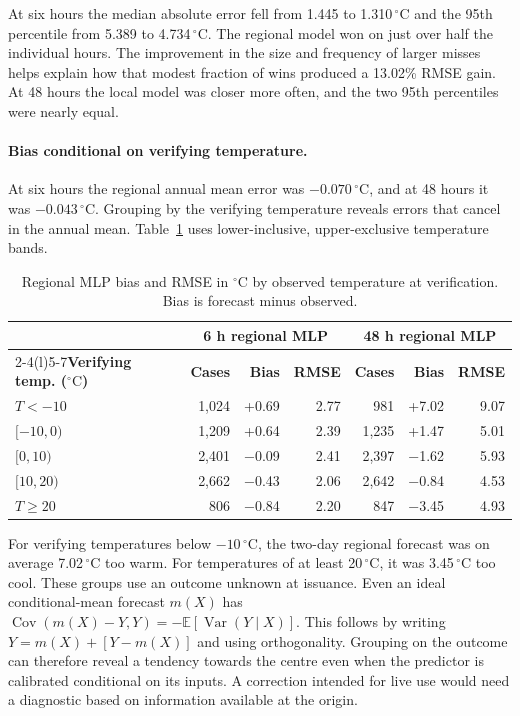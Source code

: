\documentclass[11pt,letterpaper]{article}
\newcommand{\thead}[1]{\textbf{#1}}\newcommand{\bestscore}[1]{\textbf{#1}}
\newcommand{\celsius}{\ensuremath{^{\circ}\mathrm{C}}}\newcommand{\code}[1]{\texttt{\small #1}}
\begin{document}
At six hours the median absolute error fell from 1.445 to 1.310\,\celsius{} and the 95th percentile from 5.389 to 4.734\,\celsius. The regional model won on just over half the individual hours. The improvement in the size and frequency of larger misses helps explain how that modest fraction of wins produced a 13.02\% RMSE gain. At 48 hours the local model was closer more often, and the two 95th percentiles were nearly equal.

\paragraph{Bias conditional on verifying temperature.}
At six hours the regional annual mean error was $-0.070$\,\celsius, and at 48 hours it was $-0.043$\,\celsius. Grouping by the verifying temperature reveals errors that cancel in the annual mean. Table~\ref{tab:bands} uses lower-inclusive, upper-exclusive temperature bands.



\begin{table}[!htbp]
\centering\small
\caption{Regional MLP bias and RMSE in \celsius{} by observed temperature at verification. Bias is forecast minus observed.}\label{tab:bands}
\renewcommand{\arraystretch}{1.12}\begin{tabular*}{.97\linewidth}{@{\extracolsep{\fill}}lrrrrrr@{}}\toprule
 & \multicolumn{3}{c}{\thead{6 h regional MLP}}&\multicolumn{3}{c}{\thead{48 h regional MLP}}\\
\cmidrule(lr){2-4}\cmidrule(l){5-7}\thead{Verifying temp. (\celsius)}&\thead{Cases}&\thead{Bias}&\thead{RMSE}&\thead{Cases}&\thead{Bias}&\thead{RMSE}\\\midrule
$T < -10$ & 1,024 & +0.69 & 2.77 & 981 & +7.02 & 9.07 \\
$[-10,0)$ & 1,209 & +0.64 & 2.39 & 1,235 & +1.47 & 5.01 \\
$[0,10)$ & 2,401 & −0.09 & 2.41 & 2,397 & −1.62 & 5.93 \\
$[10,20)$ & 2,662 & −0.43 & 2.06 & 2,642 & −0.84 & 4.53 \\
$T \ge 20$ & 806 & −0.84 & 2.20 & 847 & −3.45 & 4.93 \\
\bottomrule\end{tabular*}
\end{table}


For verifying temperatures below $-10$\,\celsius{}, the two-day regional forecast was on average 7.02\,\celsius{} too warm. For temperatures of at least 20\,\celsius{}, it was 3.45\,\celsius{} too cool. These groups use an outcome unknown at issuance. Even an ideal conditional-mean forecast $m(X)$ has $\operatorname{Cov}(m(X)-Y,Y)=-\mathbb E[\operatorname{Var}(Y\mid X)]$. This follows by writing $Y=m(X)+[Y-m(X)]$ and using orthogonality. Grouping on the outcome can therefore reveal a tendency towards the centre even when the predictor is calibrated conditional on its inputs. A correction intended for live use would need a diagnostic based on information available at the origin.
\end{document}
